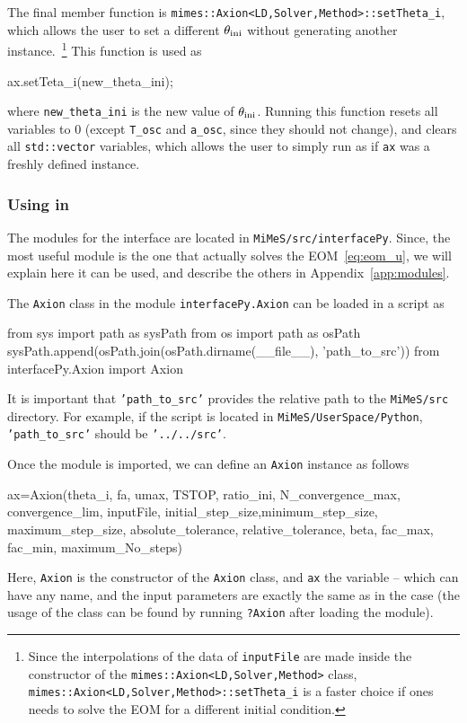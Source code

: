 \documentclass[11pt,a4paper]{article}
\begin{document}
The final member function is {\tt mimes::Axion<LD,Solver,Method>::setTheta\_i}, which allows the user to set a different $\theta_{\rm ini}{}$ without generating another instance.~\footnote{Since the interpolations of the data of {\tt inputFile} are made inside the constructor of the {\tt mimes::Axion<LD,Solver,Method>} class, {\tt mimes::Axion<LD,Solver,Method>::setTheta\_i} is a faster choice if ones needs to solve the EOM for a different initial condition.} This function is used as    
%
\begin{cpp}
	ax.setTeta_i(new_theta_ini);
\end{cpp}
%
where {\tt new\_theta\_ini} is the new value of $\theta_{\rm ini}{}$. Running this function resets all variables to $0$ (except {\tt T\_osc} and {\tt a\_osc}, since they should not change), and clears all {\tt std::vector} variables, which allows the user to simply run  as if {\tt ax} was a freshly defined instance.  

\subsubsection{Using \mimes in \PY} The modules for the \PY interface are located in {\tt MiMeS/src/interfacePy}. Since, the most useful module is the one that actually solves the EOM~\ref{eq:eom_u}, we will explain here it can be used, and describe the others in Appendix~\ref{app:modules}.

The {\tt Axion} class in the module {\tt interfacePy.Axion} can be loaded in a \PY script as 
%
\begin{py}
	from sys import path as sysPath
	from os import path as osPath
	sysPath.append(osPath.join(osPath.dirname(__file__), 'path_to_src'))
	from interfacePy.Axion import Axion
\end{py}
%
It is important that \texttt{'path_to_src'} provides the relative path to the {\tt MiMeS/src} directory. For example, if the script is located in {\tt MiMeS/UserSpace/Python}, \texttt{'path_to_src'} should be \texttt{'../../src'}.

Once the module is imported, we can define an {\tt Axion} instance as follows 
%
\begin{py}
	ax=Axion(theta_i, fa, umax, TSTOP, ratio_ini, N_convergence_max, convergence_lim, inputFile,
	initial_step_size,minimum_step_size, maximum_step_size, absolute_tolerance, 
	relative_tolerance, beta, fac_max, fac_min, maximum_No_steps)
\end{py}
%
Here, {\tt Axion} is the constructor of the {\tt Axion} class, and {\tt ax} the variable -- which can have any name, and the input parameters are exactly the same as in the \CPP case (the usage of the class can be found by running {\tt ?Axion} after loading the module). 
\end{document}
